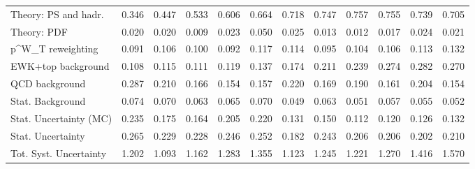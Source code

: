 \begin{tabular}{l|p{0.6cm}p{0.6cm}p{0.6cm}p{0.6cm}p{0.6cm}p{0.6cm}p{0.6cm}p{0.6cm}p{0.6cm}p{0.6cm}p{0.6cm}}
Theory: PS and hadr.                     & 0.346 & 0.447 & 0.533 & 0.606 & 0.664 & 0.718 & 0.747 & 0.757 & 0.755 & 0.739 & 0.705 \\
Theory: PDF                              & 0.020 & 0.020 & 0.009 & 0.023 & 0.050 & 0.025 & 0.013 & 0.012 & 0.017 & 0.024 & 0.021 \\
p^{W}_{T} reweighting                    & 0.091 & 0.106 & 0.100 & 0.092 & 0.117 & 0.114 & 0.095 & 0.104 & 0.106 & 0.113 & 0.132 \\
EWK+top background                       & 0.108 & 0.115 & 0.111 & 0.119 & 0.137 & 0.174 & 0.211 & 0.239 & 0.274 & 0.282 & 0.270 \\
QCD background                           & 0.287 & 0.210 & 0.166 & 0.154 & 0.157 & 0.220 & 0.169 & 0.190 & 0.161 & 0.204 & 0.154 \\
Stat. Background                         & 0.074 & 0.070 & 0.063 & 0.065 & 0.070 & 0.049 & 0.063 & 0.051 & 0.057 & 0.055 & 0.052 \\
Stat. Uncertainty (MC)                   & 0.235 & 0.175 & 0.164 & 0.205 & 0.220 & 0.131 & 0.150 & 0.112 & 0.120 & 0.126 & 0.132 \\
\hline
Stat. Uncertainty                        & 0.265 & 0.229 & 0.228 & 0.246 & 0.252 & 0.182 & 0.243 & 0.206 & 0.206 & 0.202 & 0.210 \\
\hline
Tot. Syst. Uncertainty                   & 1.202 & 1.093 & 1.162 & 1.283 & 1.355 & 1.123 & 1.245 & 1.221 & 1.270 & 1.416 & 1.570 \\
\hline
\end{tabular}
